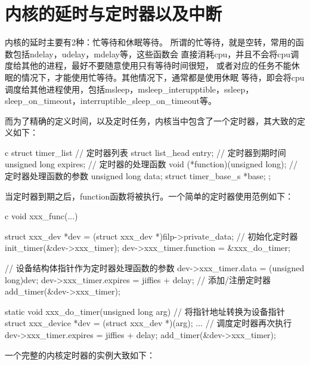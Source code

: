 \section{内核的延时与定时器以及中断}
内核的延时主要有2种：忙等待和休眠等待。
所谓的忙等待，就是空转，常用的函数包括ndelay，udelay，mdelay等，这些函数会
直接消耗cpu，并且不会将cpu调度给其他的进程，最好不要随意使用只有等待时间很短，
或者对应的任务不能休眠的情况下，才能使用忙等待。其他情况下，通常都是使用休眠
等待，即会将cpu调度给其他进程使用，包括msleep，msleep\_interupptible，ssleep，
sleep\_on\_timeout，interruptible\_sleep\_on\_timeout等。

而为了精确的定义时间，以及定时任务，内核当中包含了一个定时器，其大致的定义如下：
\begin{code-block}{c}
struct timer_list {
        // 定时器列表
        struct list_head entry;
        // 定时器到期时间
        unsigned long expires;
        // 定时器的处理函数
        void (*function)(unsigned long);
        // 定时器处理函数的参数
        unsigned long data;
        struct timer_base_s *base;
};
\end{code-block}
当定时器到期之后，function函数将被执行。一个简单的定时器使用范例如下：
\begin{code-block}{c}
void xxx_func(...)
{
        struct xxx_dev *dev = (struct xxx_dev *)filp->private_data;
        // 初始化定时器
        init_timer(&dev->xxx_timer);
        dev->xxx_timer.function = &xxx_do_timer;

        // 设备结构体指针作为定时器处理函数的参数
        dev->xxx_timer.data = (unsigned long)dev;
        dev->xxx_timer.expires = jiffies + delay;
        //  添加/注册定时器
        add_timer(&dev->xxx_timer);
}

static void xxx_do_timer(unsigned long arg)
{
        // 将指针地址转换为设备指针
        struct xxx_device *dev = (struct xxx_dev *)(arg);
        ...
        // 调度定时器再次执行
        dev->xxx_timer.expires = jiffies + delay;
        add_timer(&dev->xxx_timer);
}
\end{code-block}
一个完整的内核定时器的实例大致如下：
